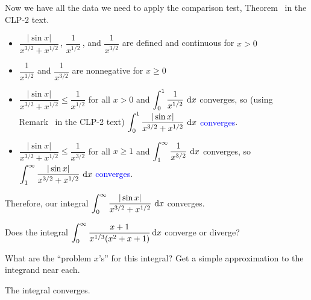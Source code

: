 \begin{solution}
Now we have all the data we need to apply the comparison test, Theorem~ in the CLP-2 text.
\begin{itemize}
\item $\dfrac{|\sin x|}{x^{3/2}+x^{1/2}}$\,, $\dfrac{1}{x^{1/2}}$\,, and $\dfrac{1}{x^{3/2}}$ are defined and continuous for $x>0$
\item $\dfrac{1}{x^{1/2}}$ and $\dfrac{1}{x^{3/2}}$ are nonnegative for $x \ge 0$
\item $\dfrac{|\sin x|}{x^{3/2}+x^{1/2}}\le \dfrac{1}{x^{1/2}}$ for all $x > 0$ and
$\displaystyle\int_0^1\dfrac{1}{x^{1/2}}~\mathrm{d}x$ converges, so (using Remark~ in the CLP-2 text)\textcolor{blue}{ $\displaystyle\int_0^{1\vphantom{\frac12}}\dfrac{|\sin x|}{x^{3/2}+x^{1/2}}~\mathrm{d}x$ converges}.
\item $\dfrac{|\sin x|}{x^{3/2}+x^{1/2}}\le \dfrac{1}{x^{3/2}}$ for all $x \ge 1$ and
$\displaystyle\int_1^\infty\dfrac{1}{x^{3/2}}~\mathrm{d}x$ converges, so \textcolor{blue}{ $\displaystyle\int_1^{\infty\vphantom{\frac12}}\dfrac{|\sin x|}{x^{3/2}+x^{1/2}}~\mathrm{d}x$ converges}.
\end{itemize}

Therefore, our integral \textcolor{blue}{$\displaystyle\int_0^\infty \frac{|\sin x|}{x^{3/2}+x^{1/2}}~\mathrm{d}x$} {converges}.

\end{solution}


\begin{Mquestion}[M121 2000A]
Does the integral
$\displaystyle\int_0^\infty\frac{x+1}{x^{1/3}(x^2+x+1)}\,\mathrm{d}x$
converge or diverge?
\end{Mquestion}

\begin{hint}
What are the ``problem $x$'s'' for this integral? Get a simple
approximation to the integrand near each.
\end{hint}

\begin{answer}
The integral converges.
\end{answer}


